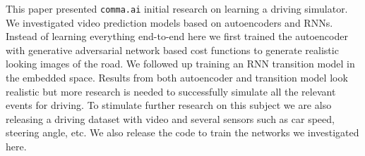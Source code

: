 \documentclass{article} %
\begin{document}
This paper presented \texttt{comma.ai} initial research on learning a driving simulator. We investigated video prediction models based on autoencoders and RNNs.
Instead of learning everything end-to-end
here we first trained the autoencoder with generative adversarial network based cost functions to generate realistic looking images of the road. We followed up
training an RNN transition model in the embedded space. Results from both autoencoder and
transition model look realistic but more research is needed to successfully simulate all the relevant events for driving. To stimulate further research on
this subject we are also releasing a driving dataset with video and several sensors such as car speed, steering angle, etc. We also release the code to train the networks
we investigated here.

% 
\end{document}
